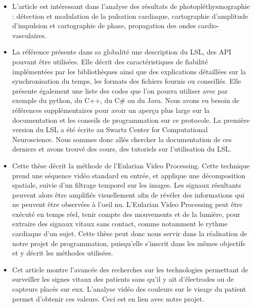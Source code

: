 \documentclass[12pt,a4paper]{article}
\begin{document}
\begin{itemize}
\newline
\item L'article \cite{Verkr} est intéressant dans l'analyse des résultats de photopléthysmographie : détection et modulation de la pulsation cardiaque, cartographie d'amplitude d'impulsion et cartographie de phase, propagation des ondes cardio-vasculaires.
\newline
\item La référence \cite{Sch} présente dans sa globalité une description du LSL, des API pouvant être utilisées. Elle décrit des caractéristiques de fiabilité implémentées par les bibliothèques ainsi que des explications détaillées sur la synchronisation du temps, les formats des fichiers fournis ou conseillés. Elle présente également une liste des codes que l'on pourra utiliser avec par exemple du python, du C++, du C\# ou du Java. 
Nous avons eu besoin de références supplémentaires pour avoir un aperçu plus large sur la documentation et les conseils de programmation sur ce protocole. La première version du LSL a été écrite au Swartz Center for Computational Neuroscience. Nous sommes donc allés chercher la documentation de ces derniers et avons trouvé des cours, des tutoriels sur l'utilisation du LSL. 
\newpage
\item Cette thèse \cite{Wu} décrit la méthode de l'Eularian Video Processing. Cette technique prend une séquence vidéo standard en entrée, et applique une décomposition spatiale, suivie d'un filtrage temporel sur les images. Les signaux résultants peuvent alors être amplifiés visuellement afin de révéler des informations qui ne peuvent être observées à l'oeil nu.
L'Eularian Video Processing peut être exécuté en temps réel, tenir compte des mouvements et de la lumière, pour extraire des signaux vitaux sans contact, comme notamment le rythme cardiaque d'un sujet.
Cette thèse peut donc nous servir dans la réalisation de notre projet de programmation, puisqu'elle s'inscrit dans les mêmes objectifs et y décrit les méthodes utilisées.
\newline
\item Cet article \cite{Tara} montre l'avancée des recherches sur les technologies permettant de surveiller les signes vitaux des patients sans qu'il y ait d'électrodes ou de capteurs placés sur eux. 
L'analyse vidéo des couleurs sur le visage du patient permet d'obtenir ces valeurs. Ceci est en lien avec notre projet.
\end{itemize}


\end{document}
